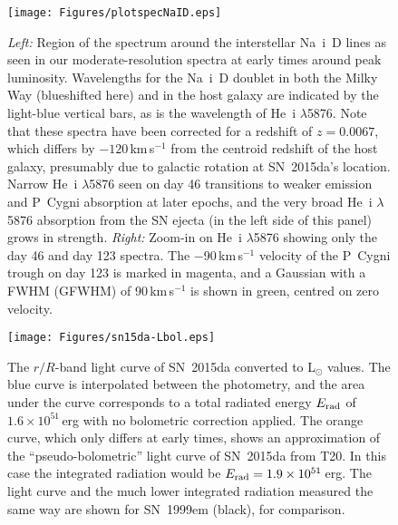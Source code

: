 \documentclass[fleqn,usenatbib,useAMS]{mnras}
\begin{document}
\begin{figure*}
\texttt{[image: Figures/plotspecNaID.eps]}
\caption{{\it Left:} Region of the spectrum around the interstellar Na~{\sc i}~D lines as seen in our moderate-resolution spectra at early times around peak luminosity.  Wavelengths for the Na~{\sc i}~D doublet in both the Milky Way (blueshifted here) and in the host galaxy are indicated by the light-blue vertical bars, as is the wavelength of He~{\sc i} $\lambda$5876.  Note that these spectra have been corrected for a redshift of $z=0.0067$, which differs by $-120$\,km\,s$^{-1}$ from the centroid redshift of the host galaxy, presumably due to galactic rotation at SN~2015da's location. Narrow He~{\sc i} $\lambda$5876 seen on day 46 transitions to weaker emission and P~Cygni absorption at later epochs, and the very broad He~{\sc i} $\lambda$5876 absorption from the SN ejecta (in the left side of this panel) grows in strength. {\it Right:} Zoom-in on He~{\sc i} $\lambda$5876 showing only the day 46 and day 123 spectra.  The $-$90\,km\,s$^{-1}$ velocity of the P~Cygni trough on day 123 is marked in magenta, and a Gaussian with a FWHM (GFWHM) of 90\,km\,s$^{-1}$ is shown in green, centred on zero velocity.}
\label{fig:na1d} 
\end{figure*}

\begin{figure}\begin{center}
\texttt{[image: Figures/sn15da-Lbol.eps]}
\end{center}
\caption{The $r/R$-band light curve of SN~2015da converted to L$_{\odot}$
  values. The blue curve is interpolated between the photometry, and
  the area under the curve corresponds to a total radiated energy
  $E_{\rm rad}$ of $1.6 \times 10^{51}$\,erg with no
  bolometric correction applied.  The orange curve, which only differs
  at early times, shows an approximation of the ``pseudo-bolometric''
  light curve of SN~2015da from T20.  In this case the integrated
  radiation would be $E_{\rm rad} = 1.9 \times 10^{51}$\,erg.  The
  light curve and the much lower integrated radiation measured the
  same way are shown for SN~1999em (black), for comparison.}
\label{fig:erad}
\end{figure}
\end{document}
